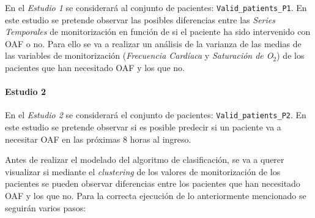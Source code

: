 En el \textit{Estudio 1} se considerará al conjunto de pacientes: \texttt{Valid\_patients\_P1}. En este estudio se pretende observar las posibles diferencias entre las \textit{Series Temporales} de monitorización en función de si el paciente ha sido intervenido con OAF o no. Para ello se va a realizar un análisis de la varianza de las medias de las variables de monitorización (\textit{Frecuencia Cardíaca} y \textit{Saturación de O$_2$}) de los pacientes que han necesitado OAF y los que no.

\paragraph{Estudio 2}\label{sec:estudio2}

En el \textit{Estudio 2} se considerará el conjunto de pacientes: \texttt{Valid\_patients\_P2}. En este estudio se pretende observar si es posible predecir si un paciente va a necesitar OAF en las próximas $8$ horas al ingreso. 

Antes de realizar el modelado del algoritmo de clasificación, se va a querer visualizar si mediante el \textit{clustering} de los valores de monitorización de los pacientes se pueden observar diferencias entre los pacientes que han necesitado OAF y los que no. Para la correcta ejecución de lo anteriormente mencionado se seguirán varios pasos:


